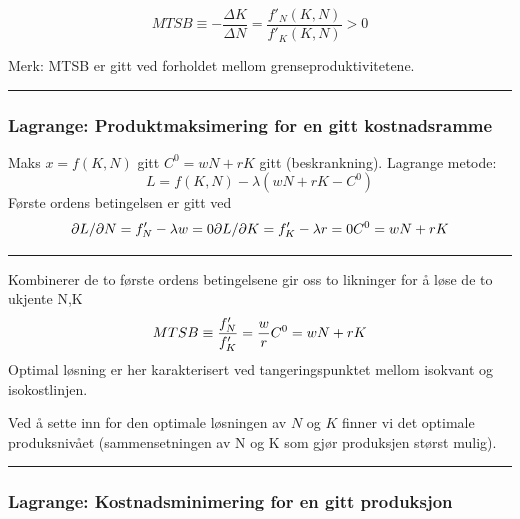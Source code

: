 \documentclass[
  letterpaper,
  DIV=11,
  numbers=noendperiod]{scrartcl}
\begin{document}
\begin{equation*}
MTSB \equiv -\frac{\Delta K}{\Delta N} =  \frac{f'_{N}(K,N)}{f'_{K}(K,N)}>0
\end{equation*}

Merk: MTSB er gitt ved forholdet mellom grenseproduktivitetene.

\begin{center}\rule{0.5\linewidth}{0.5pt}\end{center}

\subsubsection{Lagrange: Produktmaksimering for en gitt
kostnadsramme}\label{lagrange-produktmaksimering-for-en-gitt-kostnadsramme}

Maks \(x=f(K,N)\) gitt \(C^0=wN +rK\) gitt (beskrankning). Lagrange
metode: \begin{equation}
L = f(K,N) - \lambda(wN+rK-C^0)
\end{equation} Første ordens betingelsen er gitt ved \begin{equation}
\partial L/\partial N = f'_{N} - \lambda w  =0 \\ 
\partial L/\partial K = f'_{K} - \lambda r =0 \\
C^0=wN +rK
\end{equation}

\begin{center}\rule{0.5\linewidth}{0.5pt}\end{center}

Kombinerer de to første ordens betingelsene gir oss to likninger for å
løse de to ukjente N,K \begin{equation}
MTSB \equiv  \frac{f'_{N}}{f'_{K}} = \frac{w}{r} \\
C^0=wN +rK
\end{equation} Optimal løsning er her karakterisert ved
tangeringspunktet mellom isokvant og isokostlinjen.

Ved å sette inn for den optimale løsningen av \(N\) og \(K\) finner vi
det optimale produksnivået (sammensetningen av N og K som gjør
produksjen størst mulig).

\begin{center}\rule{0.5\linewidth}{0.5pt}\end{center}

\subsubsection{Lagrange: Kostnadsminimering for en gitt
produksjon}\label{lagrange-kostnadsminimering-for-en-gitt-produksjon}
\end{document}
